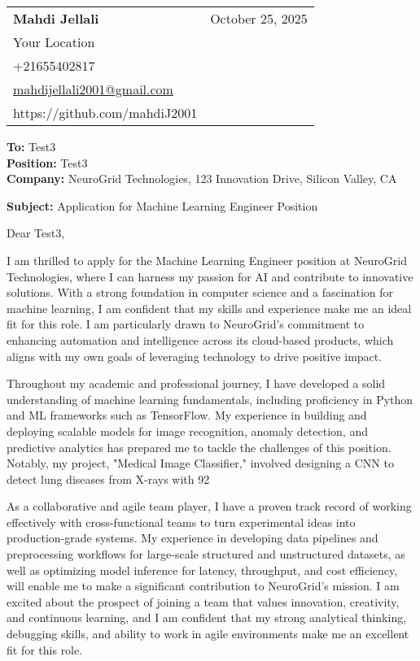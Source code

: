 \documentclass[letterpaper,11pt]{article}
\makeatletter
\newcommand{\letterHeading}[5]{
    \begin{tabular*}{\textwidth}{l@{\extracolsep{\fill}}r}
    \textbf{\Large #1} & #5 \\  %
    #2 & \\
    #3 & \\
    #4 & \\
    \end{tabular*}
    \vspace{15pt}
}
\newcommand{\letterRecipient}[3]{
    \textbf{\large To:} #1 \\
    \textbf{\large Position:} #2 \\
    \textbf{\large Company:} #3 \\
    \vspace{12pt}
}
\newcommand{\letterSubject}[1]{
    \textbf{\large Subject:} #1 \\
    \vspace{15pt}
}
\makeatother
\begin{document}
    \letterHeading
    {Mahdi Jellali}
    {Your Location}
    {+21655402817 \\ \href{mailto:mahdijellali2001@gmail.com}{mahdijellali2001@gmail.com}}
    {https://github.com/mahdiJ2001}
    {October 25, 2025}

    \letterRecipient
    {Test3}
    {Test3}
    {NeuroGrid Technologies, 123 Innovation Drive, Silicon Valley, CA}

    \letterSubject{Application for Machine Learning Engineer Position}

    Dear Test3,

    I am thrilled to apply for the Machine Learning Engineer position at NeuroGrid Technologies, where I can harness my passion for AI and contribute to innovative solutions. With a strong foundation in computer science and a fascination for machine learning, I am confident that my skills and experience make me an ideal fit for this role. I am particularly drawn to NeuroGrid's commitment to enhancing automation and intelligence across its cloud-based products, which aligns with my own goals of leveraging technology to drive positive impact.

    Throughout my academic and professional journey, I have developed a solid understanding of machine learning fundamentals, including proficiency in Python and ML frameworks such as TensorFlow. My experience in building and deploying scalable models for image recognition, anomaly detection, and predictive analytics has prepared me to tackle the challenges of this position. Notably, my project, "Medical Image Classifier," involved designing a CNN to detect lung diseases from X-rays with 92%

    As a collaborative and agile team player, I have a proven track record of working effectively with cross-functional teams to turn experimental ideas into production-grade systems. My experience in developing data pipelines and preprocessing workflows for large-scale structured and unstructured datasets, as well as optimizing model inference for latency, throughput, and cost efficiency, will enable me to make a significant contribution to NeuroGrid's mission. I am excited about the prospect of joining a team that values innovation, creativity, and continuous learning, and I am confident that my strong analytical thinking, debugging skills, and ability to work in agile environments make me an excellent fit for this role.
\end{document}

